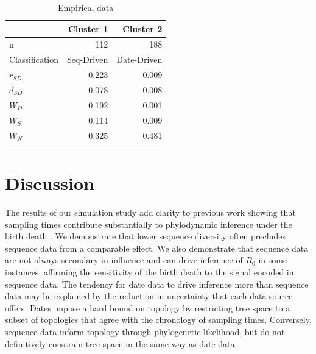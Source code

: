 \documentclass{article}
\begin{document}
\begin{table}[H]
\centering
\caption{Empirical data}
\begin{tabular}{lrr}
                    &   Cluster 1      &   Cluster 2     \\
\midrule
n                   &   112             &   188             \\
Classification      &   Seq-Driven       &   Date-Driven    \\
$r_{SD}$          &   0.223            &   0.009          \\
$d_{SD}$          &   0.078           &   0.008          \\
$W_{D}$             &   0.192            &   0.001          \\
$W_{S}$             &   0.114            &   0.009          \\
$W_{N}$             &   0.325            &   0.481          \\
\bottomrule 
\label{tab:tab2}
\end{tabular}
\end{table}
\section*{Discussion}
The results of our simulation study add clarity to previous work showing that sampling times contribute substantially to phylodynamic inference under the birth death \citep{volz_sampling_2014, Featherstone2021Infectious}. We demonstrate that lower sequence diversity often precludes sequence data from a comparable effect. We also demonstrate that sequence data are not always secondary in influence and can drive inference of $R_{0}$ in some instances, affirming the sensitivity of the birth death to the signal encoded in sequence data. The tendency for date data to drive inference more than sequence data may be explained by the reduction in uncertainty that each data source offers. Dates impose a hard bound on topology by restricting tree space to a subset of topologies that agree with the chronology of sampling times. Conversely, sequence data inform topology through phylogenetic likelihood, but do not definitively constrain tree space in the same way as date data.
\end{document}
